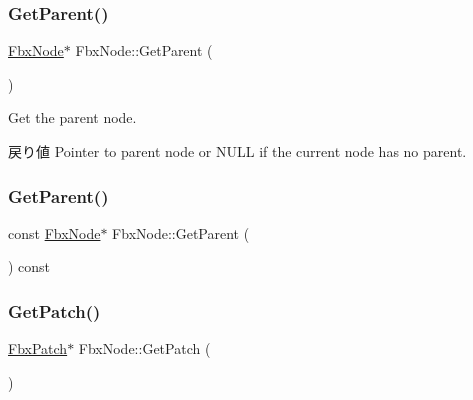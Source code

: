\subsubsection{\texorpdfstring{Get\+Parent()}{GetParent()}\hspace{0.1cm}{\footnotesize\ttfamily [1/2]}}
{\footnotesize\ttfamily \hyperlink{class_fbx_node}{Fbx\+Node}$\ast$ Fbx\+Node\+::\+Get\+Parent (\begin{DoxyParamCaption}{ }\end{DoxyParamCaption})}

Get the parent node. \begin{DoxyReturn}{戻り値}
Pointer to parent node or {\ttfamily N\+U\+LL} if the current node has no parent. 
\end{DoxyReturn}
\mbox{\label{class_fbx_node_a2c54dfbb0a944b588ded5529dfcf720b}} 
\subsubsection{\texorpdfstring{Get\+Parent()}{GetParent()}\hspace{0.1cm}{\footnotesize\ttfamily [2/2]}}
{\footnotesize\ttfamily const \hyperlink{class_fbx_node}{Fbx\+Node}$\ast$ Fbx\+Node\+::\+Get\+Parent (\begin{DoxyParamCaption}{ }\end{DoxyParamCaption}) const}

\mbox{\label{class_fbx_node_aa45a5513f61ef270d55c31c8f700309f}} 
\subsubsection{\texorpdfstring{Get\+Patch()}{GetPatch()}}
{\footnotesize\ttfamily \hyperlink{class_fbx_patch}{Fbx\+Patch}$\ast$ Fbx\+Node\+::\+Get\+Patch (\begin{DoxyParamCaption}{ }\end{DoxyParamCaption})}

